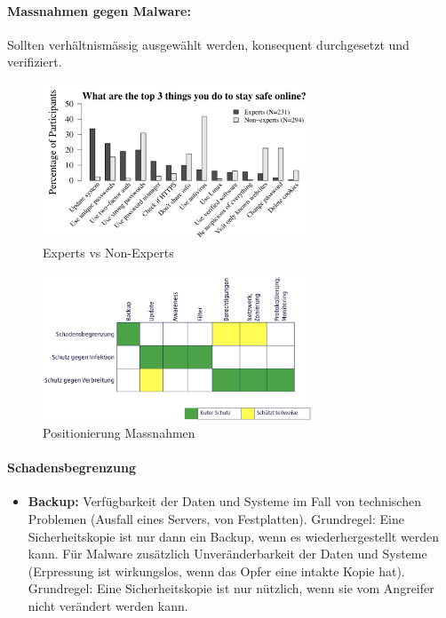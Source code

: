 \documentclass[10pt,a4paper]{article}
\begin{document}
\paragraph*{Massnahmen gegen Malware:} Sollten verhältnismässig ausgewählt werden, konsequent durchgesetzt und verifiziert.
\begin{figure}[H]
    \begin{center}
    \includegraphics[width=8cm]{images/expertvsnonexpert.png}
    \caption{Experts vs Non-Experts}
    \label{expertvsnonexpert}
    \end{center}
\end{figure}
\begin{figure}[H]
    \begin{center}
    \includegraphics[width=8cm]{images/massnahmenpost.png}
    \caption{Positionierung Massnahmen}
    \label{massnahmenpost}
    \end{center}
\end{figure}
\paragraph*{Schadensbegrenzung}
\begin{itemize}[noitemsep,topsep=0pt,leftmargin=*]
	\item \textbf{Backup:} Verfügbarkeit der Daten und Systeme im Fall von technischen Problemen (Ausfall eines Servers, von Festplatten). Grundregel: Eine Sicherheitskopie ist nur dann ein Backup, wenn es wiederhergestellt werden kann. Für Malware zusätzlich Unveränderbarkeit der Daten und Systeme (Erpressung ist wirkungslos, wenn das Opfer eine intakte Kopie hat). Grundregel: Eine Sicherheitskopie ist nur nützlich, wenn sie vom Angreifer nicht verändert werden kann.
\end{itemize}
\end{document}
